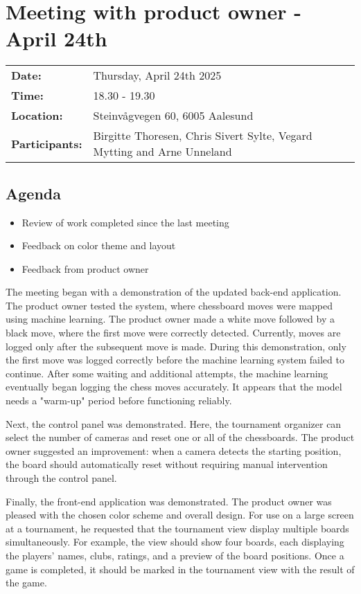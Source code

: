 \section{Meeting with product owner - April 24th}
\begin{tabular}{ll}
    \textbf{Date:} & Thursday, April 24th 2025 \\
    \textbf{Time:} & 18.30 - 19.30\\
    \textbf{Location:} & Steinvågvegen 60, 6005 Aalesund \\
    \textbf{Participants:} & Birgitte Thoresen, Chris Sivert Sylte, Vegard Mytting and Arne Unneland\\
\end{tabular}

\vspace{0.5cm}

\subsection{Agenda}

\begin{itemize} 
    \item Review of work completed since the last meeting
    \item Feedback on color theme and layout
    \item Feedback from product owner 
\end{itemize}

The meeting began with a demonstration of the updated back-end application. The product owner tested the system, where chessboard moves were mapped using machine learning. The product owner made a white move followed by a black move, where the first move were correctly detected. Currently, moves are logged only after the subsequent move is made. During this demonstration, only the first move was logged correctly before the machine learning system failed to continue. After some waiting and additional attempts, the machine learning eventually began logging the chess moves accurately. It appears that the model needs a "warm-up" period before functioning reliably.

Next, the control panel was demonstrated. Here, the tournament organizer can select the number of cameras and reset one or all of the chessboards. The product owner suggested an improvement: when a camera detects the starting position, the board should automatically reset without requiring manual intervention through the control panel. 

Finally, the front-end application was demonstrated. The product owner was pleased with the chosen color scheme and overall design. For use on a large screen at a tournament, he requested that the tournament view display multiple boards simultaneously. For example, the view should show four boards, each displaying the players' names, clubs, ratings, and a preview of the board positions. Once a game is completed, it should be marked in the tournament view with the result of the game.

